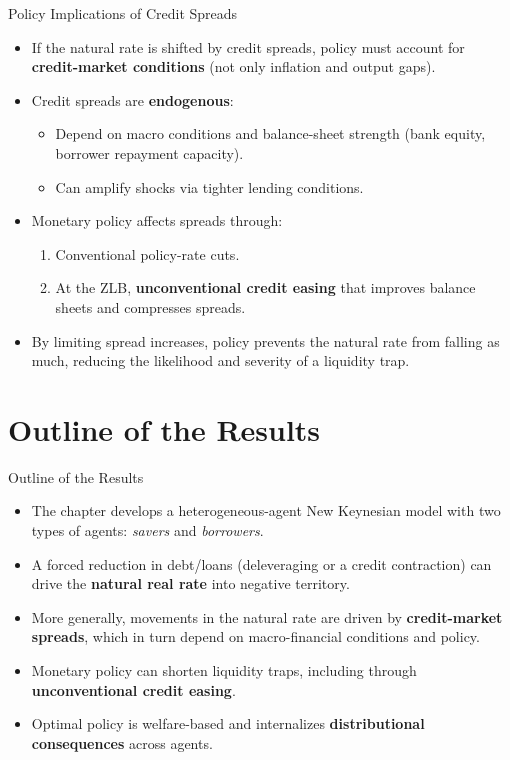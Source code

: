 \documentclass[11pt,aspectratio=169]{beamer}
\begin{document}
\begin{frame}{Policy Implications of Credit Spreads}
\small
\begin{itemize}
  \item If the natural rate is shifted by credit spreads, policy must account for \textbf{credit-market conditions} (not only inflation and output gaps).
  \vspace{0.3em}
  \item Credit spreads are \textbf{endogenous}:
  \begin{itemize}
    \item Depend on macro conditions and balance-sheet strength (bank equity, borrower repayment capacity).
    \item Can amplify shocks via tighter lending conditions.
  \end{itemize}
  \vspace{0.3em}
  \item Monetary policy affects spreads through:
  \begin{enumerate}
    \item Conventional policy-rate cuts.
    \item At the ZLB, \textbf{unconventional credit easing} that improves balance sheets and compresses spreads.
  \end{enumerate}
  \vspace{0.3em}
  \item By limiting spread increases, policy prevents the natural rate from falling as much, reducing the likelihood and severity of a liquidity trap.
\end{itemize}
\end{frame}

\section{Outline of the Results}
\begin{frame}{Outline of the Results}
\small
\begin{itemize}
  \item The chapter develops a heterogeneous-agent New Keynesian model with two types of agents: \textit{savers} and \textit{borrowers}.
  \item A forced reduction in debt/loans (deleveraging or a credit contraction) can drive the \textbf{natural real rate} into negative territory.
  \item More generally, movements in the natural rate are driven by \textbf{credit-market spreads}, which in turn depend on macro-financial conditions and policy.
  \item Monetary policy can shorten liquidity traps, including through \textbf{unconventional credit easing}.
  \item Optimal policy is welfare-based and internalizes \textbf{distributional consequences} across agents.
\end{itemize}
\end{frame}
\end{document}
